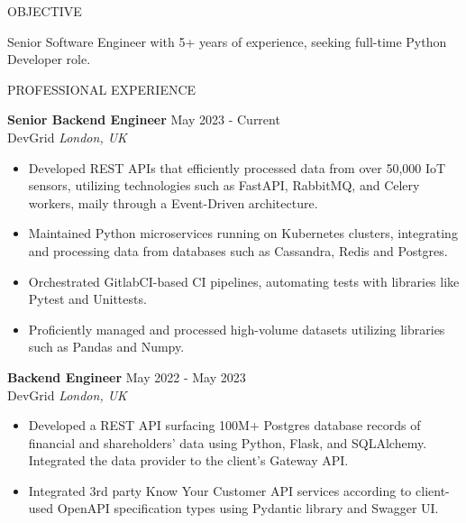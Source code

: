 \documentclass{resume} %
\begin{document}

\begin{rSection}{OBJECTIVE}

{Senior Software Engineer with 5+ years of experience, seeking full-time Python Developer role.}


\end{rSection}

\begin{rSection}{PROFESSIONAL EXPERIENCE}

\textbf{Senior Backend Engineer} \hfill May 2023 - Current\\
DevGrid \hfill \textit{London, UK}
 \begin{itemize}
    \itemsep -3pt {} 
     \item Developed REST APIs that efficiently processed data from over 50,000 IoT sensors, utilizing technologies such as FastAPI, RabbitMQ, and Celery workers, maily through a Event-Driven architecture.
     \item Maintained Python microservices running on Kubernetes clusters, integrating and processing data from databases such as Cassandra, Redis and Postgres.
     \item Orchestrated GitlabCI-based CI pipelines, automating tests with libraries like Pytest and Unittests.
     \item Proficiently managed and processed high-volume datasets utilizing libraries such as Pandas and Numpy.
 \end{itemize}
 
\textbf{Backend Engineer} \hfill May 2022 - May 2023\\
DevGrid \hfill \textit{London, UK}
 \begin{itemize}
    \itemsep -3pt {} 
     \item Developed a REST API surfacing 100M+ Postgres database records of financial and shareholders' data using Python, Flask, and SQLAlchemy. Integrated the data provider to the client's Gateway API.
     \item Integrated 3rd party Know Your Customer API services according to client-used OpenAPI specification types using Pydantic library and Swagger UI.
 \end{itemize}


\end{rSection}
\end{document}
